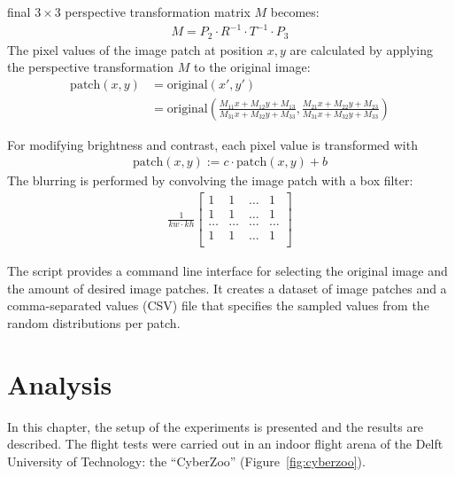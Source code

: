 \documentclass[11pt]{report}
\begin{document}
final $3 \times 3$ perspective transformation matrix $M$ becomes:
\begin{align*}
M =  P_2 \cdot R^{-1} \cdot T^{-1} \cdot P_3
\end{align*}
The pixel values of the image patch at position $x, y$ are calculated
by applying the perspective transformation $M$ to the original image:
\begin{align*}
  \text{patch}(x,y) & = \text{original}(x', y') \\
                    & = \text{original}\left(\frac{M_{11}x + M_{12}y + M_{13}}{M_{31}x + M_{32}y +
  M_{33}}, \frac{M_{21}x + M_{22}y + M_{23}}{M_{31}x + M_{32}y +
  M_{33}}\right)
\end{align*}

For modifying brightness and contrast, each pixel value is transformed
with
\begin{align*}
\text{patch}(x,y) := c \cdot \text{patch}(x,y) + b  
\end{align*}
The blurring is performed by convolving the image patch with a box
filter:
\begin{align*}
  \frac{1}{kw \cdot kh} 
  \begin{bmatrix}
    1 & 1 & \ldots & 1\\
    1 & 1 & \ldots & 1\\
    \ldots & \ldots & \ldots & \ldots\\
    1 & 1 & \ldots & 1\\
  \end{bmatrix}
\end{align*}

The script provides a command line interface for selecting the
original image and the amount of desired image patches. It creates a
dataset of image patches and a comma-separated values (CSV) file that
specifies the sampled values from the random distributions per patch.

\chapter{Analysis}
\label{chap:analysis}
In this chapter, the setup of the experiments is presented and the
results are described. %
The flight tests were carried out in an indoor flight arena of the
Delft University of Technology: the ``CyberZoo''
(Figure~\ref{fig:cyberzoo}).
\end{document}
